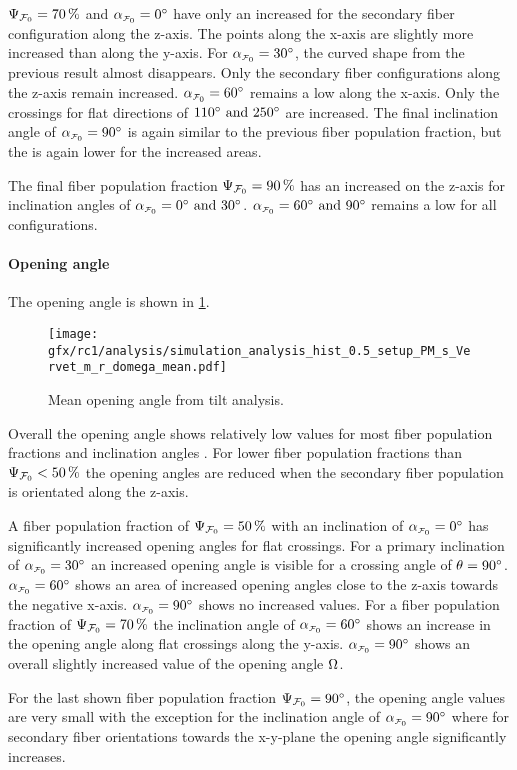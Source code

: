 \par
%
$\textnormal{$\Psi_{\textnormal{$\mathcal{F}_0$}}$}=\SI{70}{\percent}$ and $\modelInc=\SI{0}{\degree}$ have only an increased \rvalue{} for the secondary fiber configuration along the z-axis.
The points along the x-axis are slightly more increased than along the y-axis.
For $\modelInc=\SI{30}{\degree}$, the curved shape from the previous result almost disappears.
Only the secondary fiber configurations along the z-axis remain increased.
$\modelInc=\SI{60}{\degree}$ remains a low \rvalue{} along the x-axis.
Only the crossings for flat directions of $\SIlist{110;250}{\degree}$ are increased.
The final inclination angle of $\modelInc=\SI{90}{\degree}$ is again similar to the previous fiber population fraction, but the \rvalue{} is again lower for the increased areas.
\par
%
The final fiber population fraction $\textnormal{$\Psi_{\textnormal{$\mathcal{F}_0$}}$}=\SI{90}{\percent}$ has an increased \rvalue{} on the z-axis for inclination angles of $\modelInc=\SIlist{0;30}{\degree}$.
$\modelInc=\SIlist{60;90}{\degree}$ remains a low \rvalue{} for all configurations.
%
%
%
\paragraph{Opening angle \openingAngle{}}
%
The opening angle \openingAngle{} is shown in \cref{fig:sim_ana_domega}.
\par
%
\begin{figure}[!p]
\centering
\texttt{[image: gfx/rc1/analysis/simulation\_analysis\_hist\_0.5\_setup\_PM\_s\_Vervet\_m\_r\_domega\_mean.pdf]}
\caption[]{Mean opening angle \openingAngle{} from tilt analysis.}
\label{fig:sim_ana_domega}
\end{figure}
%
Overall the opening angle \openingAngle{} shows relatively low values for most fiber population fractions \modelPsi{} and inclination angles \modelInc{}.
For lower fiber population fractions than $\textnormal{$\Psi_{\textnormal{$\mathcal{F}_0$}}$} < \SI{50}{\percent}$ the opening angles are reduced when the secondary fiber population is orientated along the z-axis.
\par
%
A fiber population fraction of $\textnormal{$\Psi_{\textnormal{$\mathcal{F}_0$}}$} = \SI{50}{\percent}$ with an inclination of $\modelInc=\SI{0}{\degree}$ has significantly increased opening angles for flat crossings.
For a primary inclination of $\modelInc=\SI{30}{\degree}$ an increased opening angle is visible for a crossing angle of $\textnormal{$\theta$}=\SI{90}{\degree}$.
$\modelInc=\SI{60}{\degree}$ shows an area of increased opening angles close to the z-axis towards the negative x-axis.
$\modelInc=\SI{90}{\degree}$ shows no increased values.
%
For a fiber population fraction of $\textnormal{$\Psi_{\textnormal{$\mathcal{F}_0$}}$}=\SI{70}{\percent}$ the inclination angle of $\modelInc=\SI{60}{\degree}$ shows an increase in the opening angle along flat crossings along the y-axis.
$\modelInc=\SI{90}{\degree}$ shows an overall slightly increased value of the opening angle $\textnormal{$\Omega$}$.
\par
%
For the last shown fiber population fraction $\textnormal{$\Psi_{\textnormal{$\mathcal{F}_0$}}$}=\SI{90}{\degree}$, the opening angle values are very small with the exception for the inclination angle of $\modelInc=\SI{90}{\degree}$ where for secondary fiber orientations towards the x-y-plane the opening angle significantly increases.
%
%
%
